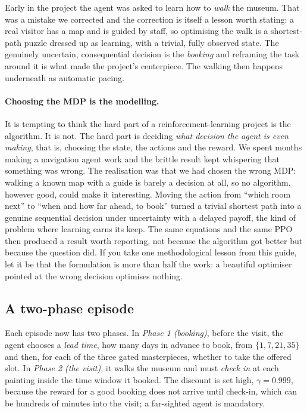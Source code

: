 \documentclass[11pt]{article}
\newcommand{\key}[1]{\textit{#1}}            %
\begin{document}
Early in the project the agent was asked to learn how to \emph{walk} the museum. That was
a mistake we corrected and the correction is itself a lesson worth stating: a real
visitor has a map and is guided by staff, so optimising the walk is a shortest-path puzzle
dressed up as learning, with a trivial, fully observed state. The genuinely uncertain,
consequential decision is the \key{booking} and reframing the task around it is what made
the project's centerpiece. The walking then happens underneath as automatic pacing.

\paragraph{Choosing the MDP is the modelling.} It is tempting to think the hard part of a
reinforcement-learning project is the algorithm. It is not. The hard part is deciding
\emph{what decision the agent is even making}, that is, choosing the state, the actions and
the reward. We spent months making a navigation agent work and the brittle result kept
whispering that something was wrong. The realisation was that we had chosen the wrong MDP:
walking a known map with a guide is barely a decision at all, so no algorithm, however good,
could make it interesting. Moving the action from ``which room next'' to ``when and how far
ahead, to book'' turned a trivial shortest path into a genuine sequential decision under
uncertainty with a delayed payoff, the kind of problem where learning earns its keep. The same equations and the same PPO then produced a result worth reporting,
not because the algorithm got better but because the question did. If you take one
methodological lesson from this guide, let it be that the formulation is more than half the
work: a beautiful optimiser pointed at the wrong decision optimises nothing.

\subsection{A two-phase episode}

Each episode now has two phases. In \key{Phase 1 (booking)}, before the visit, the agent
chooses a \key{lead time}, how many days in advance to book, from $\{1, 7, 21, 35\}$ and
then, for each of the three gated masterpieces, whether to take the offered slot. In
\key{Phase 2 (the visit)}, it walks the museum and must \key{check in} at each painting
inside the time window it booked. The discount is set high, $\gamma = 0.999$, because the
reward for a good booking does not arrive until check-in, which can be hundreds of minutes
into the visit; a far-sighted agent is mandatory.
\end{document}
